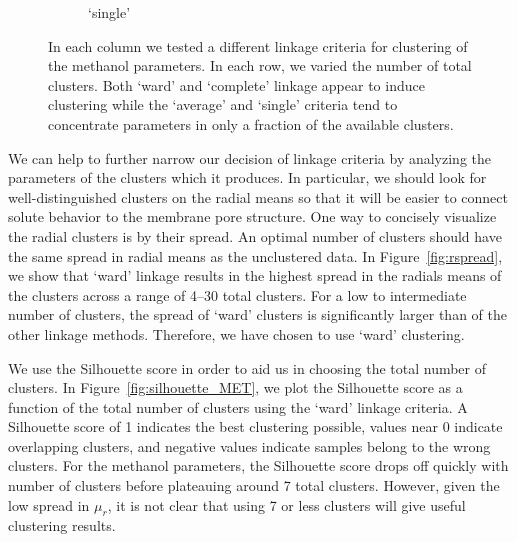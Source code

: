 \documentclass{article}
\begin{document}
\begin{figure}
\begin{subfigure}{0.24\textwidth}
  \caption{`single'}\label{fig:nclusters_single}
  \end{subfigure}
  \caption{In each column we tested a different linkage criteria for clustering
  of the methanol parameters. In each row, we varied the number of total clusters. 
  Both `ward' and `complete' linkage appear to induce clustering
  while the `average' and `single' criteria tend to concentrate parameters in
  only a fraction of the available clusters.}\label{fig:linkages}
  \end{figure}
  
  We can help to further narrow our decision of linkage criteria by analyzing 
  the parameters of the clusters which it produces. In particular, we should 
  look for well-distinguished clusters on the radial means so that it will be
  easier to connect solute behavior to the membrane pore structure. One way to
  concisely visualize the radial clusters is by their spread. An optimal number
  of clusters should have the same spread in radial means as the unclustered
  data. In Figure~\ref{fig:rspread}, we show that `ward' linkage results in 
  the highest spread in the radials means of the clusters across a range of
  4--30 total clusters. For a low to intermediate number of clusters, the 
  spread of `ward' clusters is significantly larger than of the other linkage
  methods. Therefore, we have chosen to use `ward' clustering.
  
  We use the Silhouette score in order to aid us in choosing the total number of
  clusters. In Figure~\ref{fig:silhouette_MET}, we plot the Silhouette score as
  a function of the total number of clusters using the `ward' linkage criteria. 
  A Silhouette score of 1 indicates the best clustering possible, values near
  0 indicate overlapping clusters, and negative values indicate samples belong to
  the wrong clusters. For the methanol parameters, the Silhouette score drops off
  quickly with number of clusters before plateauing around 7 total clusters. 
  However, given the low spread in $\mu_r$, it is not clear that using 7 or less 
  clusters will give useful clustering results.
  
\end{document}
